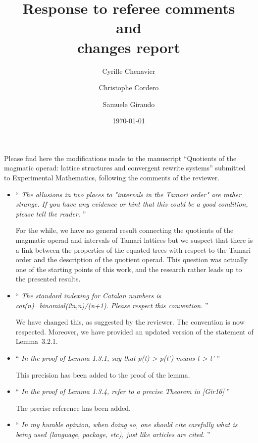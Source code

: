 \documentclass[10pt,reqno]{amsart}
\title[Response to Referees]
    {Response to referee comments \\
    and \\
    changes report}
\date{\today}
\author{Cyrille Chenavier \and Christophe Cordero \and Samuele Giraudo}
\numberwithin{equation}{subsection}
\begin{document}
\maketitle

Please find here the modifications made to the manuscript
``Quotients of the magmatic operad: lattice structures and convergent
rewrite systems'' submitted to Experimental Mathematics, following
the comments of the reviewer.
\bigbreak

\begin{itemize}

\item `` {\it
The allusions in two places to "intervals in the Tamari order" are
rather strange. If you have any evidence or hint that this could be a
good condition, please tell the reader.
}''
\smallbreak

For the while, we have no general result connecting the quotients of
the magmatic operad and intervals of Tamari lattices but we suspect
that there is a link between the properties of the equated trees
with respect to the Tamari order and the description of the quotient
operad. This question was actually one of the starting points of this
work, and the research rather leads up to the presented results.
\medbreak

\item `` {\it
The standard indexing for Catalan numbers is
cat(n)=binomial(2n,n)/(n+1). Please respect this convention.
}''
\smallbreak

We have changed this, as suggested by the reviewer. The convention is
now respected. Moreover, we have provided an updated version of
the statement of Lemma~3.2.1.
\medbreak

\item `` {\it
In the proof of Lemma 1.3.1, say that p(t) > p(t') means t > t'
}''
\smallbreak

This precision has been added to the proof of the lemma.
\medbreak

\item `` {\it
In the proof of Lemma 1.3.4, refer to a precise Theorem in [Gir16]
}''
\smallbreak

The precise reference has been added.
\medbreak

\item `` {\it
In my humble opinion, when doing so, one should cite carefully what
is being used (language, package, etc), just like articles are cited.
}''
\smallbreak


\end{itemize}
\end{document}
